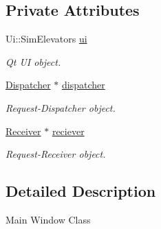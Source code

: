 \subsection*{Private Attributes}
\begin{DoxyCompactItemize}
\item 
\hypertarget{class_main_window_a49a4cc5b54e6219a3184e835d55ea15b}{
Ui::SimElevators \hyperlink{class_main_window_a49a4cc5b54e6219a3184e835d55ea15b}{ui}}
\label{class_main_window_a49a4cc5b54e6219a3184e835d55ea15b}

\begin{DoxyCompactList}\small\item\em Qt UI object. \end{DoxyCompactList}\item 
\hypertarget{class_main_window_ab3d26981023f4d64c8fab3faeb0743b1}{
\hyperlink{class_dispatcher}{Dispatcher} $\ast$ \hyperlink{class_main_window_ab3d26981023f4d64c8fab3faeb0743b1}{dispatcher}}
\label{class_main_window_ab3d26981023f4d64c8fab3faeb0743b1}

\begin{DoxyCompactList}\small\item\em Request-\/Dispatcher object. \end{DoxyCompactList}\item 
\hypertarget{class_main_window_a7c9432520c16d148bd426e93b8c86383}{
\hyperlink{class_receiver}{Receiver} $\ast$ \hyperlink{class_main_window_a7c9432520c16d148bd426e93b8c86383}{reciever}}
\label{class_main_window_a7c9432520c16d148bd426e93b8c86383}

\begin{DoxyCompactList}\small\item\em Request-\/Receiver object. \end{DoxyCompactList}\end{DoxyCompactItemize}


\subsection{Detailed Description}
Main Window Class 


